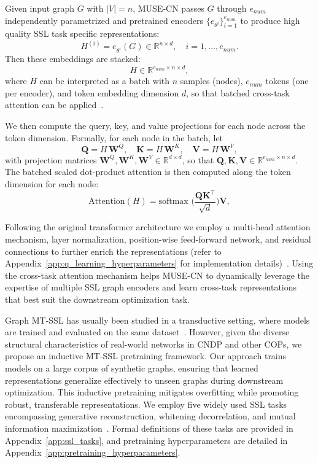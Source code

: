 \documentclass{article}
\begin{document}
Given input graph $G$ with $|V|=n$, MUSE-CN passes $G$ through $e_{num}$ independently parametrized and pretrained encoders $\{e_{\theta^i}\}_{i=1}^{e_{num}}$ to produce high quality SSL task specific representations:
\[
H^{(i)} = e_{\theta^i}(G) \in \mathbb{R}^{n \times d}, \quad i=1,\ldots,e_{num}.
\]
Then these embeddings are stacked:
\[
H \in \mathbb{R}^{e_{num} \times n \times d},
\]
where $H$ can be interpreted as a batch with $n$ samples (nodes), $e_{num}$ tokens (one per encoder), and token embedding dimension $d$, so that batched cross-task attention can be applied~\cite{vaswani2017attention}.


We then compute the query, key, and value projections for each node across the token dimension. Formally, for each node in the batch, let
\[
\mathbf{Q} = H\,\mathbf{W}^Q,\quad \mathbf{K} = H\,\mathbf{W}^K,\quad \mathbf{V} = H\,\mathbf{W}^V,
\]
with projection matrices $\mathbf{W}^Q,\mathbf{W}^K,\mathbf{W}^V \in \mathbb{R}^{d \times d}$, so that $\mathbf{Q},\mathbf{K},\mathbf{V} \in \mathbb{R}^{e_{num} \times n \times d}$. The batched scaled dot-product attention is then computed along the token dimension for each node:
\[
\text{Attention}(H) = \text{softmax }\!\Biggl(\frac{\mathbf{Q}\mathbf{K}^\top}{\sqrt{d}}\Biggr)\mathbf{V},
\]

Following the original transformer architecture we employ a multi-head attention mechanism, layer normalization, position-wise feed-forward network, and residual connections to further enrich the representations (refer to Appendix~\ref{app:q_learning_hyperparameters} for implementation details)~\cite{vaswani2017attention}. Using the cross-task attention mechanism helps MUSE-CN to dynamically leverage the expertise of multiple SSL graph encoders and learn cross-task representations that best suit the downstream optimization task.


Graph MT-SSL has usually been studied in a transductive setting, where models are trained and evaluated on the same dataset~\cite{khoshbakhtian2024mega,ju2022multi,jin2021automated}. However, given the diverse structural characteristics of real-world networks in CNDP and other COPs, we propose an inductive MT-SSL pretraining framework. Our approach trains models on a large corpus of synthetic graphs, ensuring that learned representations generalize effectively to unseen graphs during downstream optimization. This inductive pretraining mitigates overfitting while promoting robust, transferable representations. We employ five widely used SSL tasks encompassing generative reconstruction, whitening decorrelation, and mutual information maximization~\cite{ju2022multi,khoshbakhtian2024mega}. Formal definitions of these tasks are provided in Appendix~\ref{app:ssl_tasks}, and pretraining hyperparameters are detailed in Appendix~\ref{app:pretraining_hyperparameters}.
\end{document}

